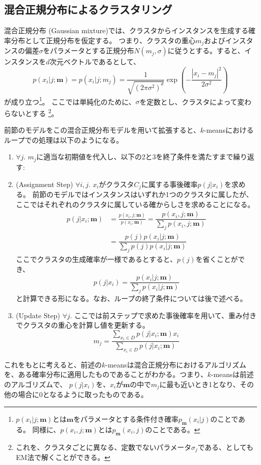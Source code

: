 \documentclass[9pt,draft,twocolumn]{jsarticle}
\newcommand{\sbm}{;\bm{m}}
\begin{document}
\subsection{混合正規分布によるクラスタリング}
混合正規分布 (Gaussian mixture)では、クラスタからインスタンスを生成する確率分布として正規分布を仮定する。
つまり、クラスタの重心$m_j$およびインスタンスの偏差$\sigma$をパラメータとする正規分布$N(m_j, \sigma)$に従うとする。すると、インスタンスを$d$次元ベクトルであるとして、
\[ p(x_i | j; \bm{m}) = p(x_i | j; m_j) = \frac{1}{\sqrt{(2\pi\sigma^2)^d}} 
	\exp \left( -\frac{|x_i-m_j|^2}{2\sigma^2} \right)
\]
が成り立つ\footnote{$p(x_i | j; \bm{m})$とは$\bm{m}$をパラメータとする条件付き確率$p_{\bm{m}}(x_i | j)$のことである。
同様に、$p(x_i,j ; \bm{m})$とは$p_{\bm{m}}(x_i,j )$のことである。}。
ここでは単純化のために、$\sigma$を定数とし、クラスタによって変わらないとする%
\footnote{これを、クラスタごとに異なる、定数でないパラメータ$\sigma_j$である、としてもEM法で解くことができる。}。

前節のモデルをこの混合正規分布モデルを用いて拡張すると、$k$-meansにおけるループでの処理は以下のようになる。
\begin{enumerate}
  \item $\forall j$. $m_j$に適当な初期値を代入し、以下の2と3を終了条件を満たすまで繰り返す:
  \item (Assignment Step) $\forall i,j$.
  $x_i$がクラスタ$C_j$に属する事後確率$p(j|x_i)$を求める。
  前節のモデルではインスタンスはいずれか1つのクラスタに属したが、ここではそれぞれのクラスタに属している確からしさを求めることになる。
  \[
  \begin{split}
  p(j|x_i\sbm) &= \frac{ p(x_i,j\sbm) }{p(x_i\sbm) } = \dfrac{ p(x_i,j\sbm) }{ \displaystyle\sum_j
  p(x_i,j\sbm) } \\
  &= \dfrac{ p(j) p(x_i|j\sbm) }{ \displaystyle\sum_j p(j) p(x_i|j\sbm) }
  \end{split} 
  \]
  ここでクラスタの生成確率が一様であるとすると、$p(j)$を省くことができ、
  \[ p(j|x_i) 
  	= \dfrac{ p(x_i|j\sbm) }{ \displaystyle\sum_j p(x_i|j\sbm) }
  \]
  と計算できる形になる。なお、ループの終了条件については後で述べる。
  \item (Update Step) $\forall j$. ここでは前ステップで求めた事後確率を用いて、重み付きでクラスタの重心を計算し値を更新する。
  \[
  m_j=\dfrac{\displaystyle\sum_{x_i \in D} p(j|x_i\sbm) x_i}{\displaystyle\sum_{x_i \in D}
  p(j|x_i\sbm)}
  \]
\end{enumerate}
これをもとに考えると、前述の$k$-meansは混合正規分布におけるアルゴリズムを、ある確率分布に適用したものであることがわかる。つまり、$k$-meansは前述のアルゴリズムで、
$p(j|x_i)$を、$x_i$が$\bm{m}$の中で$m_j$に最も近いとき1となり、その他の場合に0となるように取ったものである。
\end{document}
